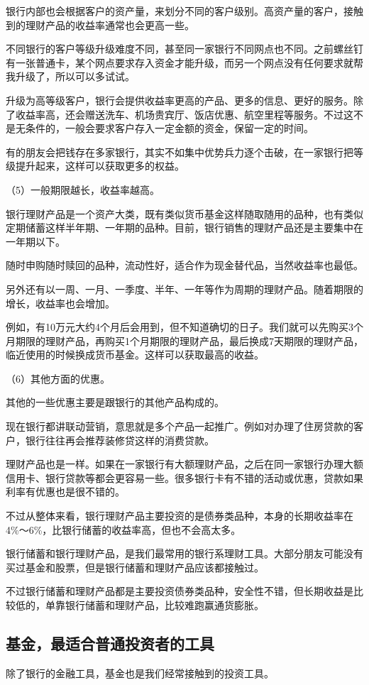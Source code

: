 银行内部也会根据客户的资产量，来划分不同的客户级别。高资产量的客户，接触到的理财产品的收益率通常也会更高一些。

不同银行的客户等级升级难度不同，甚至同一家银行不同网点也不同。之前螺丝钉有一张普通卡，某个网点要求存入资金才能升级，而另一个网点没有任何要求就帮我升级了，所以可以多试试。

升级为高等级客户，银行会提供收益率更高的产品、更多的信息、更好的服务。除了收益率高，还会赠送洗车、机场贵宾厅、饭店优惠、航空里程等服务。不过这不是无条件的，一般会要求客户存入一定金额的资金，保留一定的时间。

有的朋友会把钱存在多家银行，其实不如集中优势兵力逐个击破，在一家银行把等级提升起来，这样可以获取更多的权益。

（5）一般期限越长，收益率越高。

银行理财产品是一个资产大类，既有类似货币基金这样随取随用的品种，也有类似定期储蓄这样半年期、一年期的品种。目前，银行销售的理财产品还是主要集中在一年期以下。

随时申购随时赎回的品种，流动性好，适合作为现金替代品，当然收益率也最低。

另外还有以一周、一月、一季度、半年、一年等作为周期的理财产品。随着期限的增长，收益率也会增加。

例如，有10万元大约4个月后会用到，但不知道确切的日子。我们就可以先购买3个月期限的理财产品，再购买1个月期限的理财产品，最后换成7天期限的理财产品，临近使用的时候换成货币基金。这样可以获取最高的收益。

（6）其他方面的优惠。

其他的一些优惠主要是跟银行的其他产品构成的。

现在银行都讲联动营销，意思就是多个产品一起推广。例如对办理了住房贷款的客户，银行往往再会推荐装修贷这样的消费贷款。

理财产品也是一样。如果在一家银行有大额理财产品，之后在同一家银行办理大额信用卡、银行贷款等都会更容易一些。很多银行卡有不错的活动或优惠，贷款如果利率有优惠也是很不错的。

不过从整体来看，银行理财产品主要投资的是债券类品种，本身的长期收益率在4\%～6\%，比银行储蓄的收益率高，但也不会高太多。

银行储蓄和银行理财产品，是我们最常用的银行系理财工具。大部分朋友可能没有买过基金和股票，但是银行储蓄和理财产品应该都接触过。

不过银行储蓄和理财产品都是主要投资债券类品种，安全性不错，但长期收益是比较低的，单靠银行储蓄和理财产品，比较难跑赢通货膨胀。

\subsection{基金，最适合普通投资者的工具}
除了银行的金融工具，基金也是我们经常接触到的投资工具。

